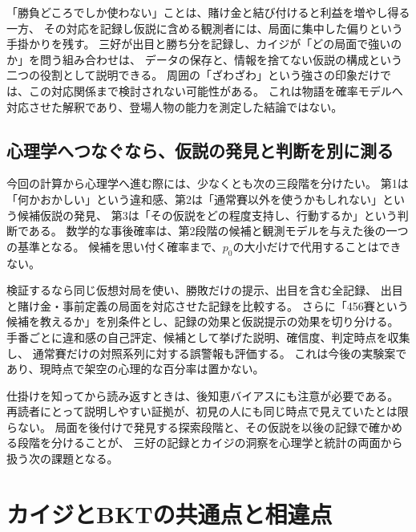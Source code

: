 \documentclass[11pt,a4paper]{article}
\numberwithin{equation}{section}
\begin{document}
「勝負どころでしか使わない」ことは、賭け金と結び付けると利益を増やし得る一方、
その対応を記録し仮説に含める観測者には、局面に集中した偏りという手掛かりを残す。
三好が出目と勝ち分を記録し、カイジが「どの局面で強いのか」を問う組み合わせは、
データの保存と、情報を捨てない仮説の構成という二つの役割として説明できる。
周囲の「ざわざわ」という強さの印象だけでは、この対応関係まで検討されない可能性がある。
これは物語を確率モデルへ対応させた解釈であり、登場人物の能力を測定した結論ではない。

\subsection{心理学へつなぐなら、仮説の発見と判断を別に測る}
今回の計算から心理学へ進む際には、少なくとも次の三段階を分けたい。
第1は「何かおかしい」という違和感、第2は「通常賽以外を使うかもしれない」という候補仮説の発見、
第3は「その仮説をどの程度支持し、行動するか」という判断である。
数学的な事後確率は、第2段階の候補と観測モデルを与えた後の一つの基準となる。
候補を思い付く確率まで、$p_0$の大小だけで代用することはできない。

検証するなら同じ仮想対局を使い、勝敗だけの提示、出目を含む全記録、
出目と賭け金・事前定義の局面を対応させた記録を比較する。
さらに「456賽という候補を教えるか」を別条件とし、記録の効果と仮説提示の効果を切り分ける。
手番ごとに違和感の自己評定、候補として挙げた説明、確信度、判定時点を収集し、
通常賽だけの対照系列に対する誤警報も評価する。
これは今後の実験案であり、現時点で架空の心理的な百分率は置かない。

仕掛けを知ってから読み返すときは、後知恵バイアス\cite{fischhoff1975}にも注意が必要である。
再読者にとって説明しやすい証拠が、初見の人にも同じ時点で見えていたとは限らない。
局面を後付けで発見する探索段階と、その仮説を以後の記録で確かめる段階を分けることが、
三好の記録とカイジの洞察を心理学と統計の両面から扱う次の課題となる。

\clearpage
\section{カイジとBKTの共通点と相違点}
\end{document}
